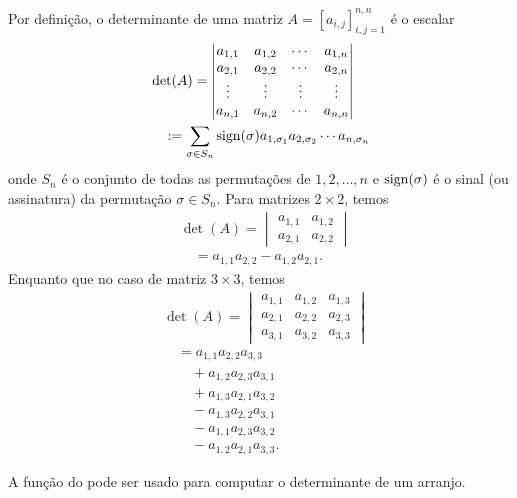 Por definição, o determinante de uma matriz $A = [a_{i,j}]_{i,j=1}^{n,n}$ é o escalar
\begin{align}
  & \det(A) =
            \begin{vmatrix}
              a_{1,1} & a_{1,2} & \cdots & a_{1,n}\\
              a_{2,1} & a_{2,2} & \cdots & a_{2,n}\\
              \vdots & \vdots & \vdots & \vdots\\
              a_{n,1} & a_{n,2} & \cdots & a_{n,n}                
            \end{vmatrix}\\
  & \text{}\quad := \sum_{\sigma\in S_n}\operatorname{sign}(\sigma)a_{1,\sigma_1}a_{2,\sigma_2}\cdots a_{n,\sigma_n}
\end{align}
onde $S_n$ é o conjunto de todas as permutações de ${1, 2, \dotsc, n}$ e $\operatorname{sign}(\sigma)$ é o sinal (ou assinatura) da permutação $\sigma\in S_n$. Para matrizes $2\times 2$, temos
\begin{align}
  & \det(A) =
      \begin{vmatrix}
        a_{1,1} & a_{1,2}\\
        a_{2,1} & a_{2,2}
      \end{vmatrix}\\
  & \text{}\quad = a_{1,1}a_{2,2} - a_{1,2}a_{2,1}.
\end{align}
Enquanto que no caso de matriz $3\times 3$, temos
\begin{align}
  & \det(A) =
            \begin{vmatrix}
              a_{1,1} & a_{1,2} & a_{1,3}\\
              a_{2,1} & a_{2,2} & a_{2,3}\\
              a_{3,1} & a_{3,2} & a_{3,3}
            \end{vmatrix}\\
  & \text{}\quad = a_{1,1}a_{2,2}a_{3,3}\\
  & \text{}\qquad + a_{1,2}a_{2,3}a_{3,1}\\
  & \text{}\qquad + a_{1,3}a_{2,1}a_{3,2}\\
  & \text{}\qquad - a_{1,3}a_{2,2}a_{3,1}\\
  & \text{}\qquad - a_{1,1}a_{2,3}a_{3,2}\\
  & \text{}\qquad - a_{1,2}a_{2,1}a_{3,3}.
\end{align}

A função {\PYTHONnumpyDOTlinalgDOTdet} do {\numpy} pode ser usado para computar o determinante de um arranjo.

